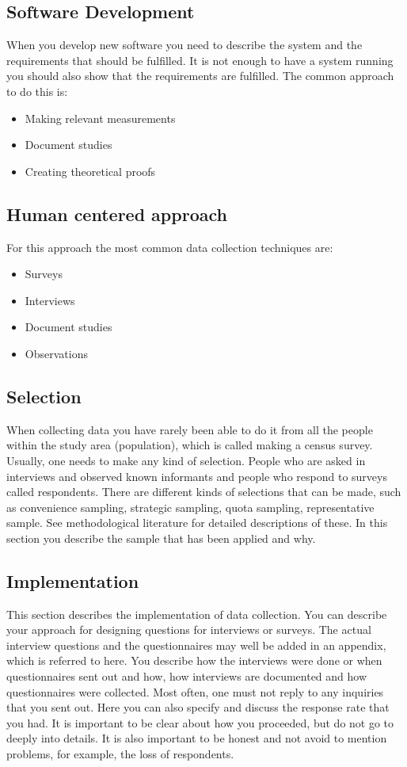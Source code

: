 \subsection{Software Development}
When you  develop new software you need to describe the system and the requirements that should be fulfilled. It is not enough to have a system running you should also show that the requirements are fulfilled. The common approach to do this is:
\begin{itemize}
	\item Making relevant measurements
	\item Document studies
	\item Creating theoretical proofs
\end{itemize}

\subsection{Human centered approach}
For this approach the most common data collection techniques are:
\begin{itemize}
	\item Surveys
	\item Interviews
	\item Document studies
	\item Observations
\end{itemize}

\subsection{Selection}
When collecting data you have rarely been able to do it from all the people within the study area (population), which is called making a census survey. Usually, one needs to make any kind of selection. People who are asked in interviews and observed known informants and people who respond to surveys called respondents. There are different kinds of selections that can be made, such as convenience sampling, strategic sampling, quota sampling, representative sample. See methodological literature for detailed descriptions of these. In this section you describe the sample that has been applied and why.

\subsection{Implementation}
This section describes the implementation of data collection. You can describe your approach for designing questions for interviews or surveys. The actual interview questions and the questionnaires may well be added in an appendix, which is referred to here. You describe how the interviews were done or when questionnaires sent out and how, how interviews are documented and how questionnaires were collected. Most often, one must not reply to any inquiries that you sent out. Here you can also specify and discuss the response rate that you had. It is important to be clear about how you proceeded, but do not go to deeply into details. It is also important to be honest and not avoid to mention problems, for example, the loss of respondents.

